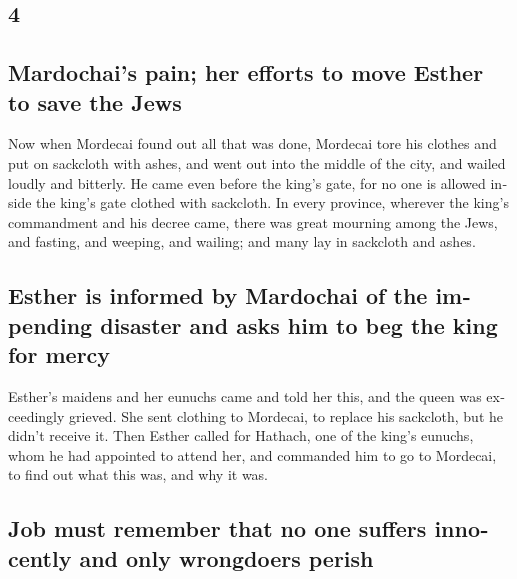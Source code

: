 \begin{paracol}{2}
\begin{otherlanguage}{english}
\hypertarget{section-7}{%
\section{4}\label{section-7}}

\hypertarget{mardochais-pain-her-efforts-to-move-esther-to-save-the-jews}{%
\subsection{Mardochai's pain; her efforts to move Esther to save the
Jews}\label{mardochais-pain-her-efforts-to-move-esther-to-save-the-jews}}

 Now when Mordecai found out all that was done, Mordecai
tore his clothes and put on sackcloth with ashes, and went out into the
middle of the city, and wailed loudly and bitterly.  He
came even before the king's gate, for no one is allowed inside the
king's gate clothed with sackcloth.  In every province,
wherever the king's commandment and his decree came, there was great
mourning among the Jews, and fasting, and weeping, and wailing; and many
lay in sackcloth and ashes.

\hypertarget{esther-is-informed-by-mardochai-of-the-impending-disaster-and-asks-him-to-beg-the-king-for-mercy}{%
\subsection{Esther is informed by Mardochai of the impending disaster
and asks him to beg the king for
mercy}\label{esther-is-informed-by-mardochai-of-the-impending-disaster-and-asks-him-to-beg-the-king-for-mercy}}

 Esther's maidens and her eunuchs came and told her this,
and the queen was exceedingly grieved. She sent clothing to Mordecai, to
replace his sackcloth, but he didn't receive it.  Then
Esther called for Hathach, one of the king's eunuchs, whom he had
appointed to attend her, and commanded him to go to Mordecai, to find
out what this was, and why it was.

\hypertarget{job-must-remember-that-no-one-suffers-innocently-and-only-wrongdoers-perish}{%
\subsection{Job must remember that no one suffers innocently and only
wrongdoers
perish}\label{job-must-remember-that-no-one-suffers-innocently-and-only-wrongdoers-perish}}


\end{otherlanguage}
\end{paracol}

